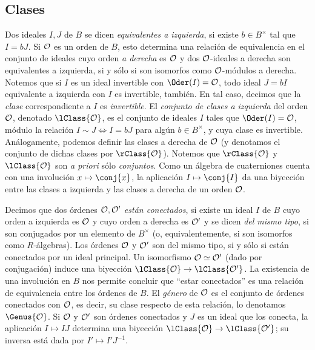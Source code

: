 \subsection{Clases}
Dos ideales $I,J$ de $B$ se dicen \emph{equivalentes a izquierda}, si
existe $b\in B^{\times}$ tal que $I=bJ$.
Si $\cal{O}$ es un orden de $B$, esto determina una relaci\'{o}n de
equivalencia en el conjunto de ideales cuyo orden \emph{a derecha} es
$\cal{O}$ y dos $\cal{O}$-ideales a derecha son equivalentes a izquierda,
si y s\'{o}lo si son isomorfos como $\cal{O}$-m\'{o}dulos a derecha.
Notemos que si $I$ es un ideal invertible con $\Oder(I)=\cal{O}$, todo
ideal $J=bI$ equivalente a izquierda con $I$ es invertible, tambi\'{e}n.
En tal caso, decimos que la \emph{clase} correspondiente a $I$ es
\emph{invertible}. El \emph{conjunto de clases a izquierda} del orden
$\cal{O}$, denotado $\lClass{\cal{O}}$, es el conjunto de ideales
$I$ tales que $\Oder(I)=\cal{O}$, m\'{o}dulo la relaci\'{o}n
$I\sim J\Leftrightarrow I=bJ$ para alg\'{u}n $b\in B^{\times}$, y cuya clase
es invertible. An\'{a}logamente, podemos definir las clases a derecha de
$\cal{O}$ (y denotamos el conjunto de dichas clases por $\rClass{\cal{O}}$).
Notemos que $\rClass{\cal{O}}$ y $\lClass{\cal{O}}$ son \emph{a priori}
s\'{o}lo \emph{conjuntos}.
Como un \'{a}lgebra de cuaterniones cuenta con una involuci\'{o}n
$x\mapsto\conj{x}$, la aplicaci\'{o}n $I\mapsto\conj{I}$ da una biyecci\'{o}n
entre las clases a izquierda y las clases a derecha de un orden $\cal{O}$.

Decimos que dos \'{o}rdenes $\cal{O},\cal{O}'$ \emph{est\'{a}n conectados},
si existe un ideal $I$ de $B$ cuyo orden a izquierda es $\cal{O}$ y cuyo
orden a derecha es $\cal{O}'$ y se dicen \emph{del mismo tipo}, si son
conjugados por un elemento de $B^{\times}$ (o, equivalentemente, si son
isomorfos como $R$-\'{a}lgebras). Los \'{o}rdenes $\cal{O}$ y $\cal{O}'$ son
del mismo tipo, si y s\'{o}lo si est\'{a}n conectados por un ideal principal.
Un isomorfismo $\cal{O}\simeq\cal{O}'$ (dado por conjugaci\'{o}n) induce una
biyecci\'{o}n $\lClass{\cal{O}}\rightarrow\lClass{\cal{O}'}$.
La existencia de una involuci\'{o}n en $B$ nos permite concluir
que ``estar conectados'' es una relaci\'{o}n de equivalencia entre los
\'{o}rdenes de $B$. El \emph{g\'{e}nero} de $\cal{O}$ es el conjunto de
\'{o}rdenes conectados con $\cal{O}$, es decir, su clase respecto de
esta relaci\'{o}n, lo denotamos $\Genus{\cal{O}}$.
Si $\cal{O}$ y $\cal{O}'$ son \'{o}rdenes conectados
y $J$ es un ideal que los conecta, la aplicaci\'{o}n $I\mapsto IJ$ determina
una biyecci\'{o}n $\lClass{\cal{O}}\rightarrow\lClass{\cal{O}'}$;
su inversa est\'{a} dada por $I'\mapsto I'J^{-1}$.
%
%
%
% 

